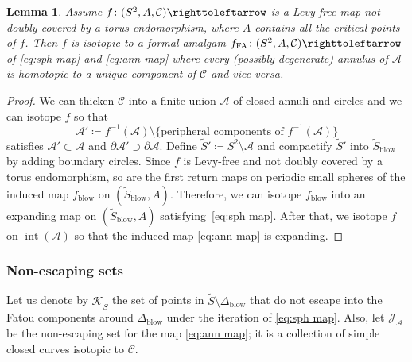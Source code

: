 \documentclass{amsart}
\theoremstyle{plain}
\newtheorem{lemma}[theorem]{Lemma}
\theoremstyle{definition}
\theoremstyle{remark}
\renewcommand{\AA}{{\mathcal A}}
\newcommand{\blowup}{{\operatorname{blow}}}
\newcommand{\filled}{{\mathcal K}}
\newcommand{\reminder}[1]{\textsl{$\lhd\rhd$#1$\lhd\rhd$}\marginpar{$\lhd\rhd\lhd\rhd\lhd\rhd$}}%
\newcommand{\hide}[1]{}
\newcommand{\Jul}{{\mathcal J}}
\newcommand{\CC}{{\mathcal C}}
\newcommand{\intr}{{\operatorname{int}}}
\newcommand\selfmap{\righttoleftarrow}
\begin{document}
\begin{lemma}
\label{lem:FormAmalg}
Assume  $f\colon (S^2,A,\CC)\selfmap$ is a Levy-free map not doubly covered by a torus endomorphism, where $A$ contains all the critical points of $f$. Then $f$ is isotopic to a formal amalgam $f_{\text{FA}}\colon (S^2,A,\CC)\selfmap$ of \eqref{eq:sph map} and \eqref{eq:ann map} where every (possibly degenerate) annulus of $\AA$ is homotopic to a unique component of $\CC$ and vice versa.
\end{lemma}
\begin{proof}
   We can thicken $\CC$ into a finite union $\AA$ of closed annuli and circles and we can isotope $f$ so that 
   \[\AA'\coloneq f^{-1}(\AA)\setminus \{\text{peripheral components of $f^{-1}(\AA)$}\}\]
   satisfies $\AA'\subset \AA$ and $\partial \AA'\supset \partial \AA$. Define $\widetilde S'\coloneq S^2\setminus \AA$ and compactify $\widetilde S'$ into $\widetilde S_\blowup$ by adding boundary circles. Since $f$ is Levy-free and not doubly covered by a torus endomorphism, so are the first return maps on periodic small spheres of the induced map $f_\blowup$ on $(\widetilde S_\blowup,A)$. Therefore, we can isotope $f_\blowup$ into an expanding map on $(\widetilde S_\blowup,A)$ satisfying~\eqref{eq:sph map}. After that, we isotope $f$ on $\intr(\AA)$ so that the induced map \eqref{eq:ann map} is expanding. 
\end{proof}


\subsubsection{Non-escaping sets}
\label{sss:NonEscSets}

Let us  denote by $\filled_{\widetilde S}$ the set of points in $\widetilde S\setminus \Delta_\blowup$ that do not escape into the Fatou components around $\Delta_\blowup$ under the iteration of \eqref{eq:sph map}. Also, let $\Jul_\AA$ be the non-escaping set for the map \eqref{eq:ann map}; it is a collection of simple closed curves isotopic to $\CC$. 
\end{document}
